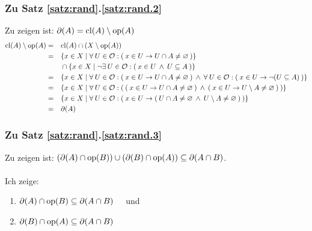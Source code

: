 \subsubsection{Zu Satz \ref{satz:rand}.\ref{satz:rand.2}}\label{anh:rand.2}
    Zu zeigen ist: $\partial(A) = \text{cl}(A) \setminus \text{op}(A)$
    \begin{align*}
    \text{cl}(A) \setminus \text{op}(A) &= &&\text{cl}(A) \cap (X \setminus \text{op}(A))\\
                        &= &&\{x \in X \mid \forall\: U \in \mathcal{O}: (\: x \in U \to U \cap A \neq \varnothing \:)\}\\ 
                        &  &&\cap \{x \in X \mid \neg \exists\: U \in \mathcal{O}: (\: x \in U \:\land\: U \subseteq A\:)\}\\
                        &= &&\{x \in X \mid \forall\: U \in \mathcal{O}: (\: x \in U \to U \cap A \neq \varnothing\:) \:\land\: \forall\: U \in \mathcal{O}:(\: x \in U \to \neg(U \subseteq A) \:) \}\\
                        &= &&\{x \in X \mid \forall\: U \in \mathcal{O}: (\: (\: x \in U \to U \cap A \neq \varnothing \:) \:\land\: (\: x \in U \to U \setminus A \neq \varnothing \:) \:) \}\\
                        &= &&\{x \in X \mid \forall\: U \in \mathcal{O}: (\: x \in U \to (\: U \cap A \neq \varnothing \:\land\: U \setminus A \neq \varnothing \:) \:) \}\\
                        &= &&\partial(A)
    \end{align*}


\subsubsection{Zu Satz \ref{satz:rand}.\ref{satz:rand.3}}\label{anh:rand.3}
    Zu zeigen ist: $(\partial(A) \cap \text{op}(B)) \cup (\partial(B) \cap \text{op}(A)) \subseteq \partial(A \cap B)$.\\ \ \\
    Ich zeige:
    \begin{enumerate}
    \item\label{anh:rand.3.1} $\partial(A) \cap \text{op}(B) \subseteq \partial(A \cap B) \quad$ und
    \item\label{anh:rand.3.2} $\partial(B) \cap \text{op}(A) \subseteq \partial(A \cap B)$
    \end{enumerate}

